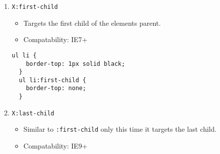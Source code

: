 \documentclass[12pt]{article}
\begin{document}
\begin{enumerate}
\item {\texttt{X:first-child}}
  \begin{itemize}
    \item Targets the first child of the elements parent.  
    \item Compatability: IE7+
  \end{itemize}
  \begin{lstlisting}[frame=single]
  ul li {
    border-top: 1px solid black;
  }
  ul li:first-child {
    border-top: none;
  }
  \end{lstlisting}

\item {\texttt{X:last-child}}
  \begin{itemize}
    \item Similar to \texttt{:first-child} only this time it targets the last child.
    \item Compatability: IE9+
  \end{itemize}


\end{enumerate}
\end{document}
